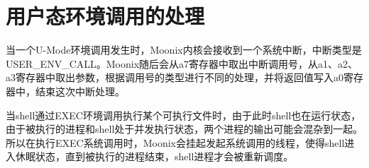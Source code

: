 \section{用户态环境调用的处理}

当一个U-Mode环境调用发生时，Moonix内核会接收到一个系统中断，中断类型是USER\_ENV\_CALL。Moonix随后会从a7寄存器中取出中断调用号，从a1、a2、a3寄存器中取出参数，根据调用号的类型进行不同的处理，并将返回值写入a0寄存器中，结束这次中断处理。

当shell通过EXEC环境调用执行某个可执行文件时，由于此时shell也在运行状态，由于被执行的进程和shell处于并发执行状态，两个进程的输出可能会混杂到一起。所以在执行EXEC系统调用时，Moonix会挂起发起系统调用的线程，使得shell进入休眠状态，直到被执行的进程结束，shell进程才会被重新调度。

